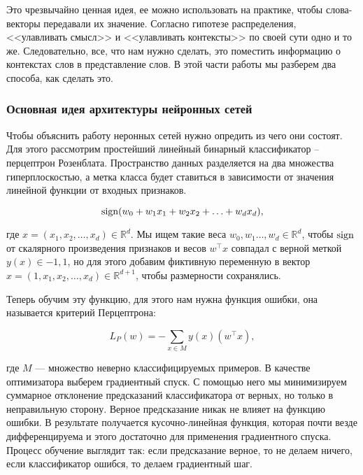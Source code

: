 Это чрезвычайно ценная идея, ее можно использовать на практике, чтобы слова-векторы передавали их значение. Согласно гипотезе распределения, <<улавливать смысл>> и <<улавливать контексты>> по своей сути одно и то же. Следовательно, все, что нам нужно сделать, это поместить информацию о контекстах слов в представление слов. В этой части работы мы разберем два способа, как сделать это.


\subsubsection{Основная идея архитектуры нейронных сетей}

Чтобы объяснить работу неронных сетей нужно опредить из чего они состоят. Для этого рассмотрим простейший линейный бинарный классификатор -- перцептрон Розенблата. Пространство данных разделяется на два множества гиперплоскостью, а метка класса будет ставиться в зависимости от значения линейной функции от входных признаков.

\begin{equation}
 \operatorname*{sign} (w_0 + w_1x_1 + w_2x_2 + \ldots + w_dx_d),
\end{equation}

где $x =(x_1, x_2, \ldots, x_d) \in \mathds{R}^d$. Мы ищем такие веса $w_0, w_1 \ldots, w_d \in \mathds{R}^d$, чтобы $\operatorname*{sign}$ от скалярного произведения признаков и весов $w^\top x$ совпадал с верной меткой $y(x) \in {-1,1}$, но для этого добавим фиктивную переменную в вектор $x =(1, x_1, x_2, \ldots, x_d) \in \mathds{R}^{d+1}$, чтобы размерности сохранялись.

\bigskip
Теперь обучим эту функцию, для этого нам нужна функция ошибки, она называется критерий Перцептрона:

\begin{equation}
 L_P(w) = - \sum_{x \in M} y(x)(w^\top x),
\end{equation}

где $M$ --- множество неверно классифицируемых примеров. В качестве оптимизатора выберем градиентный спуск. С помощью него мы минимизируем суммарное отклонение предсказаний классификатора от верных, но только в неправильную сторону. Верное предсказание никак не влияет на функцию ошибки. В результате получается кусочно-линейная функция, которая почти везде дифференцируема и этого достаточно для применения градиентного спуска. Процесс обучение выглядит так: если предсказание верное, то не делаем ничего, если классификатор ошибся, то делаем градиентный шаг.

